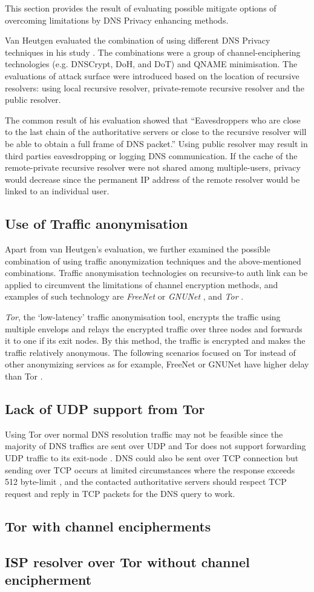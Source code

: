 This section provides the result of evaluating possible mitigate options of overcoming limitations by DNS Privacy enhancing methods.

Van Heutgen evaluated the combination of using different DNS Privacy techniques in his study \cite{van2018privacy}.
The combinations were a group of channel-enciphering technologies (e.g. DNSCrypt, DoH, and DoT) and QNAME minimisation.
The evaluations of attack surface were introduced based on the location of recursive resolvers: using local recursive resolver, private-remote recursive resolver and the public resolver.

The common result of his evaluation showed that ``Eavesdroppers who are close to the last chain of the authoritative servers or close to the recursive resolver will be able to obtain a full frame of DNS packet\cite{van2018privacy}.''
Using public resolver may result in third parties eavesdropping or logging DNS communication.
If the cache of the remote-private recursive resolver were not shared among multiple-users, privacy would decrease since the permanent IP address of the remote resolver would be linked to an individual user.

\subsection{Use of Traffic anonymisation}
Apart from van Heutgen’s evaluation, we further examined the possible combination of using traffic anonymization techniques and the above-mentioned combinations.
Traffic anonymisation technologies on recursive-to auth link can be applied to circumvent the limitations of channel encryption methods, and examples of such technology are \textit{FreeNet} \cite{clarke2001freenet} or \textit{GNUNet} \cite{grothoff2017gnunet}, and \textit{Tor} \cite{dingledine2004tor}.

\textit{Tor}, the `low-latency' traffic anonymisation tool, encrypts the traffic using multiple envelops and relays the encrypted traffic over three nodes and forwards it to one if its exit nodes. By this method, the traffic is encrypted and makes the traffic relatively anonymous.
The following scenarios focused on Tor instead of other anonymizing services as for example, FreeNet or GNUNet have higher delay than Tor \cite{anonymousoverdns}.

\subsection{Lack of UDP support from Tor}
Using Tor over normal DNS resolution traffic may not be feasible since the majority of DNS traffics are sent over UDP and Tor does not support forwarding UDP traffic to its exit-node \cite{udp-over-tor}.
DNS could also be sent over TCP connection but sending over TCP occurs at limited circumstances where the response exceeds 512 byte-limit \cite{rfc7766}, and the contacted authoritative servers should respect TCP request and reply in TCP packets for the DNS query to work.

\subsection{Tor with channel encipherments}
\subsection{ISP resolver over Tor without channel encipherment}
